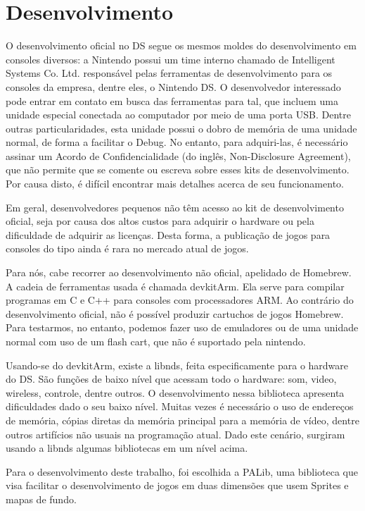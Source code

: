 \documentclass[brazil]{abnt}
\begin{document}
\section{Desenvolvimento}

O desenvolvimento oficial no DS segue os mesmos moldes do desenvolvimento em consoles diversos: a Nintendo possui um time interno chamado de Intelligent Systems Co. Ltd. responsável pelas ferramentas de desenvolvimento para os consoles da empresa, dentre eles, o Nintendo DS. O desenvolvedor interessado pode entrar em contato em busca das ferramentas para tal, que incluem uma unidade especial conectada ao computador por meio de uma porta USB. Dentre outras particularidades, esta unidade possui o dobro de memória de uma unidade normal, de forma a facilitar o Debug. No entanto, para adquiri-las, é necessário assinar um Acordo de Confidencialidade (do inglês, Non-Disclosure Agreement), que não permite que se comente ou escreva sobre esses kits de desenvolvimento. Por causa disto, é difícil encontrar mais detalhes acerca de seu funcionamento.

Em geral, desenvolvedores pequenos não têm acesso ao kit de desenvolvimento oficial, seja por causa dos altos custos para adquirir o hardware ou pela dificuldade de adquirir as licenças. Desta forma, a publicação de jogos para consoles do tipo ainda é rara no mercado atual de jogos.

Para nós, cabe recorrer ao desenvolvimento não oficial, apelidado de Homebrew. A cadeia de ferramentas usada é chamada devkitArm. Ela serve para compilar programas em C e C++ para consoles com processadores ARM. Ao contrário do desenvolvimento oficial, não é possível produzir cartuchos de jogos Homebrew. Para testarmos, no entanto, podemos fazer uso de emuladores ou de uma unidade normal com uso de um flash cart, que não é suportado pela nintendo.

Usando-se do devkitArm, existe a libnds, feita especificamente para o hardware do DS. São funções de baixo nível que acessam todo o hardware: som, video, wireless, controle, dentre outros. O desenvolvimento nessa biblioteca apresenta dificuldades dado o seu baixo nível. Muitas vezes é necessário o uso de endereços de memória, cópias diretas da memória principal para a memória de vídeo, dentre outros artifícios não usuais na programação atual. Dado este cenário, surgiram usando a libnds algumas bibliotecas em um nível acima.

Para o desenvolvimento deste trabalho, foi escolhida a PALib, uma biblioteca que visa facilitar o desenvolvimento de jogos em duas dimensões que usem Sprites e mapas de fundo.
\end{document}
